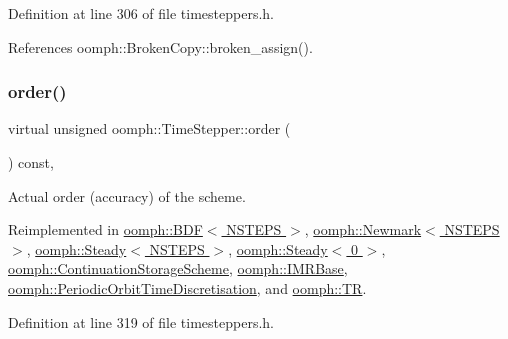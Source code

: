 Definition at line 306 of file timesteppers.\+h.



References oomph\+::\+Broken\+Copy\+::broken\+\_\+assign().

\mbox{\label{classoomph_1_1TimeStepper_a251e5d4b37381e582b7cf4c554e2e724}} 
\subsubsection{\texorpdfstring{order()}{order()}}
{\footnotesize\ttfamily virtual unsigned oomph\+::\+Time\+Stepper\+::order (\begin{DoxyParamCaption}{ }\end{DoxyParamCaption}) const\hspace{0.3cm}{\ttfamily [inline]}, {\ttfamily [virtual]}}



Actual order (accuracy) of the scheme. 



Reimplemented in \hyperlink{classoomph_1_1BDF_a778cd01f9e0e8047d5838f6283512131}{oomph\+::\+B\+D\+F$<$ N\+S\+T\+E\+P\+S $>$}, \hyperlink{classoomph_1_1Newmark_a98d62ea693c8d7a90b6b8273c92c3c75}{oomph\+::\+Newmark$<$ N\+S\+T\+E\+P\+S $>$}, \hyperlink{classoomph_1_1Steady_ac1735b614e9adf73a889e37afdd6d3a2}{oomph\+::\+Steady$<$ N\+S\+T\+E\+P\+S $>$}, \hyperlink{classoomph_1_1Steady_ac1735b614e9adf73a889e37afdd6d3a2}{oomph\+::\+Steady$<$ 0 $>$}, \hyperlink{classoomph_1_1ContinuationStorageScheme_ab9ebd03333ee68a6ec5038386134d79a}{oomph\+::\+Continuation\+Storage\+Scheme}, \hyperlink{classoomph_1_1IMRBase_a8e556df579d73b46214f8993b2ff12d1}{oomph\+::\+I\+M\+R\+Base}, \hyperlink{classoomph_1_1PeriodicOrbitTimeDiscretisation_a395bce926ad4a0dfb474aaf05f607b99}{oomph\+::\+Periodic\+Orbit\+Time\+Discretisation}, and \hyperlink{classoomph_1_1TR_a007e98e499c2440b05947b626d610425}{oomph\+::\+TR}.



Definition at line 319 of file timesteppers.\+h.

\mbox{\label{classoomph_1_1TimeStepper_abf0f84ac9e7c1266dea9bd9e479fb2bf}} 
